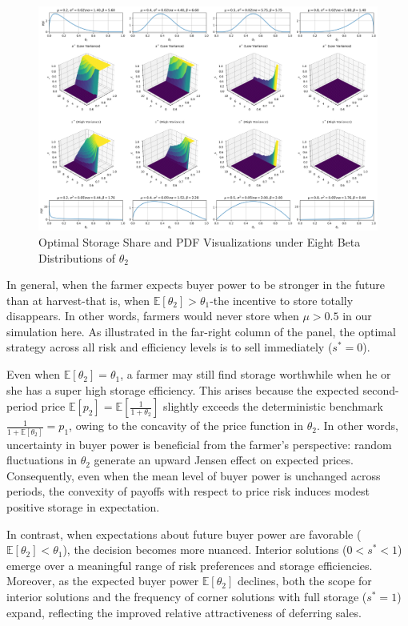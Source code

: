 \begin{figure}[ht!]
\centering
\includegraphics[width=\textwidth]{model_figures/3D_formulation.png}
\caption{Optimal Storage Share and PDF Visualizations under Eight Beta Distributions of $\theta_2$}
\label{Figure:3D_formulation}
\end{figure}

In general, when the farmer expects buyer power to be stronger in the future than at harvest-that is, when $\mathbb{E}[\theta_2] > \theta_1$-the incentive to store totally disappears. In other words, farmers would never store when $\mu > 0.5$ in our simulation here. As illustrated in the far-right column of the panel, the optimal strategy across all risk and efficiency levels is to sell immediately ($s^* = 0$).

Even when $\mathbb{E}[\theta_2] = \theta_1$, a farmer may still find storage worthwhile when he or she has a super high storage efficiency. This arises because the expected second-period price $\mathbb{E}[p_2] = \mathbb{E}\!\left[\frac{1}{1+\theta_2}\right]$ slightly exceeds the deterministic benchmark $\frac{1}{1+\mathbb{E}[\theta_2]} = p_1$, owing to the concavity of the price function in $\theta_2$. In other words, uncertainty in buyer power is beneficial from the farmer’s perspective: random fluctuations in $\theta_2$ generate an upward Jensen effect on expected prices. Consequently, even when the mean level of buyer power is unchanged across periods, the convexity of payoffs with respect to price risk induces modest positive storage in expectation.

In contrast, when expectations about future buyer power are favorable ($\mathbb{E}[\theta_2] < \theta_1$), the decision becomes more nuanced. Interior solutions ($0 < s^* < 1$) emerge over a meaningful range of risk preferences and storage efficiencies. Moreover, as the expected buyer power $\mathbb{E}[\theta_2]$ declines, both the scope for interior solutions and the frequency of corner solutions with full storage ($s^* = 1$) expand, reflecting the improved relative attractiveness of deferring sales.



